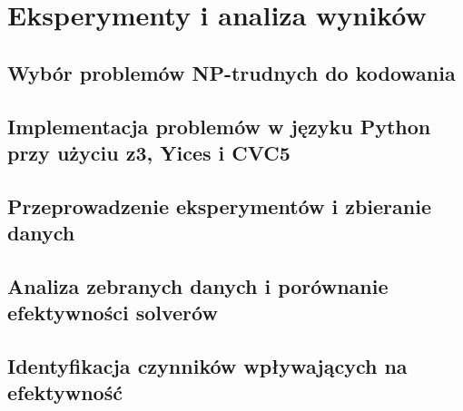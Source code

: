\chapter{Eksperymenty i analiza wyników}

\section{Wybór problemów NP-trudnych do kodowania}

\section{Implementacja problemów w języku Python przy użyciu z3, Yices i CVC5}

\section{Przeprowadzenie eksperymentów i zbieranie danych}

\section{Analiza zebranych danych i porównanie efektywności solverów}

\section{Identyfikacja czynników wpływających na efektywność}

